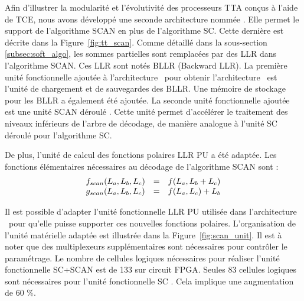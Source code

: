 Afin d'illustrer la modularité et l'évolutivité des processeurs TTA conçus à l'aide de TCE, nous avons développé une seconde architecture nommée \TTSCAN. Elle permet le support de l'algorithme SCAN en plus de l'algorithme SC. Cette dernière est décrite dans la Figure~\ref{fig:tt_scan}.
Comme détaillé dans la sous-section \ref{subsec:soft_algo}, les sommes partielles sont remplacées par des LLR dans l'algorithme SCAN. Ces LLR sont notés BLLR (Backward LLR). La première unité fonctionnelle ajoutée à l'architecture \TTSC~pour obtenir l'architecture \TTSCAN~est l'unité de chargement et de sauvegardes des BLLR. Une mémoire de stockage pour les BLLR a également été ajoutée. La seconde unité fonctionnelle ajoutée est une unité \og SCAN déroulé \fg. Cette unité permet d'accélérer le traitement des niveaux inférieurs de l'arbre de décodage, de manière analogue à l'unité \og SC déroulé \fg pour l'algorithme SC.

De plus, l'unité de calcul des fonctions polaires LLR PU a été adaptée. Les fonctions élémentaires nécessaires au décodage de l'algorithme SCAN sont : 
\begin{eqnarray}
  \begin{array}{l c l}
    f_{scan}(L_a,L_b,L_c) & = & f(L_a, L_b  + L_c) \\
    g_{scan}(L_a,L_b,L_c) & = & f(L_a, L_c) + L_b
  \end{array}
  \label{eq:bp}
\end{eqnarray}


Il est possible d'adapter l'unité fonctionnelle LLR PU utilisée dans l'architecture \TTSC~pour qu'elle puisse supporter ces nouvelles fonctions polaires. L'organisation de l'unité matérielle adaptée est illustrée dans la Figure~\ref{fig:scan_unit}. Il est à noter que des multiplexeurs supplémentaires sont nécessaires pour contrôler le paramétrage. Le nombre de cellules logiques nécessaires pour réaliser l'unité fonctionnelle \og SC+SCAN \fg est de 133 sur circuit FPGA. Seules 83 cellules logiques sont nécessaires pour l'unité fonctionnelle \og SC \fg. Cela implique une augmentation de 60 \%.



